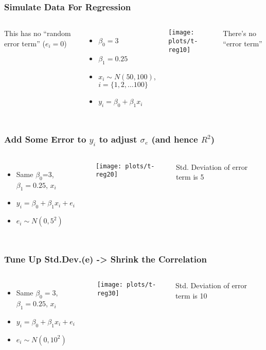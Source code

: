 \documentclass[10pt,english]{beamer}
\newenvironment{topcolumns}{\begin{columns}[t]}{\end{columns}}
\def\Sweavesize{\normalsize}
\begin{document}
\begin{frame}[containsverbatim]
\frametitle{Simulate Data For Regression}

\begin{topcolumns}%


\column{6cm}

This has no ``random error term'' ($e_{i}=0$)
\begin{itemize}
\item $\beta_{0}=3$
\item $\beta_{1}=0.25$
\item $x_{i}\sim N(50,100)$, $i=\{1,2,\ldots100\}$
\item $y_{i}=\beta_{0}+\beta_{1}x_{i}$
\end{itemize}

\column{6cm}


\texttt{[image: plots/t-reg10]}

There's no ``error term''
\end{topcolumns}%
\end{frame}

\begin{frame}[containsverbatim]
\frametitle{Add Some Error to $y_i$ to adjust $\sigma_e$ (and hence $R^2$)}


\begin{topcolumns}%




\column{6cm}
\begin{itemize}
\item Same $\beta_{0}$=3, $\beta_{1}=0.25$, $x_{i}$
\item $y_{i}=\beta_{0}+\beta_{1}x_{i}+e_{i}$
\item $e_{i}\sim N(0,5^{2})$
\end{itemize}

\def\Sweavesize{\scriptsize}



\column{6cm}


\texttt{[image: plots/t-reg20]}

Std. Deviation of error term is 5
\end{topcolumns}%
\end{frame}

\begin{frame}[containsverbatim]
\frametitle{Tune Up Std.Dev.(e) -> Shrink the Correlation}


\begin{topcolumns}%


\column{6cm}
\begin{itemize}
\item Same $\beta_{0}=3$, $\beta_{1}=0.25$, $x_{i}$
\item $y_{i}=\beta_{0}+\beta_{1}x_{i}+e_{i}$
\item $e_{i}\sim N(0,10^{2})$
\end{itemize}

\def\Sweavesize{\scriptsize}



\column{6cm}


\texttt{[image: plots/t-reg30]}

Std. Deviation of error term is 10
\end{topcolumns}%
\end{frame}
\end{document}
